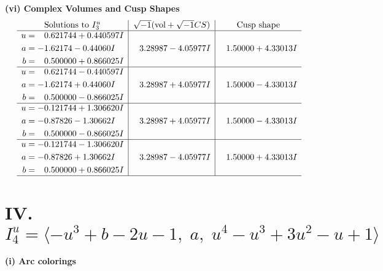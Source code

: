 \documentclass[1p]{elsarticle_modified}
\theoremstyle{definition}
\newcommand{\I}{\sqrt{-1}}
\begin{document}
\newpage\flushleft \textbf{(vi) Complex Volumes and Cusp Shapes}
$$\begin{array}{c|c|c}  
\text{Solutions to }I^u_{3}& \I (\text{vol} + \sqrt{-1}CS) & \text{Cusp shape}\\
 \hline 
\begin{aligned}
u &= \phantom{-}0.621744 + 0.440597 I \\
a &= -1.62174 - 0.44060 I \\
b &= \phantom{-}0.500000 + 0.866025 I\end{aligned}
 & \phantom{-}3.28987 - 4.05977 I & \phantom{-}1.50000 + 4.33013 I \\ \hline\begin{aligned}
u &= \phantom{-}0.621744 - 0.440597 I \\
a &= -1.62174 + 0.44060 I \\
b &= \phantom{-}0.500000 - 0.866025 I\end{aligned}
 & \phantom{-}3.28987 + 4.05977 I & \phantom{-}1.50000 - 4.33013 I \\ \hline\begin{aligned}
u &= -0.121744 + 1.306620 I \\
a &= -0.87826 - 1.30662 I \\
b &= \phantom{-}0.500000 - 0.866025 I\end{aligned}
 & \phantom{-}3.28987 + 4.05977 I & \phantom{-}1.50000 - 4.33013 I \\ \hline\begin{aligned}
u &= -0.121744 - 1.306620 I \\
a &= -0.87826 + 1.30662 I \\
b &= \phantom{-}0.500000 + 0.866025 I\end{aligned}
 & \phantom{-}3.28987 - 4.05977 I & \phantom{-}1.50000 + 4.33013 I\\
 \hline 
 \end{array}$$\newpage\newpage\renewcommand{\arraystretch}{1}
\centering \section*{IV. $I^u_{4}= \langle - u^3+b-2 u-1,\;a,\;u^4- u^3+3 u^2- u+1 \rangle$}
\flushleft \textbf{(i) Arc colorings}\\
\end{document}
